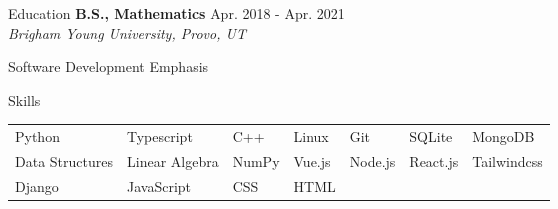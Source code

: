 \documentclass{resume} %
\begin{document}
\begin{rSection}{Education}
{\bf B.S., Mathematics }\hfill {Apr. 2018 - Apr. 2021} \\
\textit{Brigham Young University, Provo, UT}
    \begin{compactitem}
        \item Software Development Emphasis
    \end{compactitem}
\end{rSection}

\begin{rSection}{Skills}
        \begin{tabular}{ l l l l l l l }
            Python & Typescript & C++ & Linux & Git  & SQLite   &  MongoDB\\  
            Data Structures & Linear Algebra & NumPy & Vue.js & Node.js    & React.js & Tailwindcss \\
            Django & JavaScript & CSS & HTML
        \end{tabular}
\end{rSection}
\end{document}
